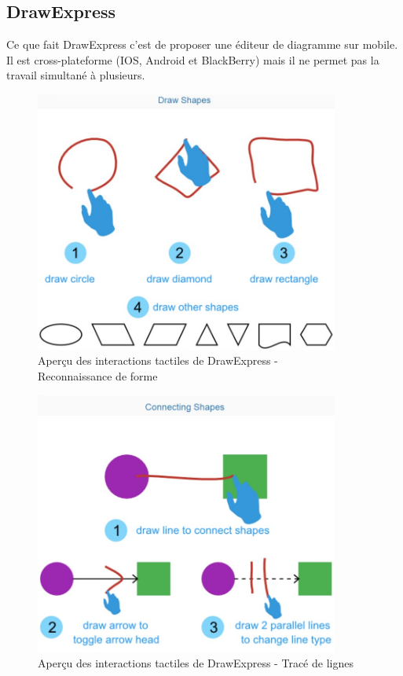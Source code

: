 \documentclass[a4paper,11pt]{article}
\begin{document}
\subsection{DrawExpress}
Ce que fait DrawExpress c’est de proposer une éditeur de diagramme sur mobile. Il est cross-plateforme (IOS, Android et BlackBerry) mais il ne permet pas la travail simultané à plusieurs.

\begin{figure}
	\centering
	\includegraphics[width=10cm]{img/DrawExpressRecognition.PNG}
	\caption{Aperçu des interactions tactiles de DrawExpress - \\Reconnaissance de forme}
\end{figure}

\begin{figure}
	\centering
	\includegraphics[width=10cm]{img/DrawExpressLinks.PNG}
	\caption{Aperçu des interactions tactiles de DrawExpress - Tracé de lignes}
\end{figure}
\end{document}
